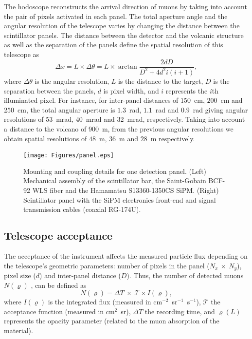 \documentclass[letterpaper,11pt]{article}
\begin{document}
The hodoscope reconstructs the arrival direction of muons by taking into account the pair of pixels activated in each panel. The total aperture angle and the angular resolution of the telescope varies by changing the distance between the scintillator panels. The distance between the detector and the volcanic structure as well as the separation of the panels define the spatial resolution of this telescope as
\begin{equation}
\Delta x=L\times\Delta\theta=L\times \arctan{\frac{2dD}{D^2+4d^2i(i+1)}},
\end{equation}
where $\Delta\theta$ is the angular resolution, $L$ is the distance to the target, $D$ is the separation between the panels, $d$ is pixel width, and $i$ represents the $i$th illuminated pixel. For instance, for inter-panel distances of $150$~cm, $200$~cm and $250$~cm, the total angular aperture is $1.3$~rad, $1.1$~rad and $0.9$~rad giving angular resolutions of $53$~mrad, $40$~mrad and $32$~mrad, respectively. Taking into account a distance to the volcano of $900$~m, from the previous angular resolutions we obtain spatial resolutions of $48$~m, $36$~m and $28$~m respectively.
\begin{figure}[htb]
\centering
\texttt{[image: Figures/panel.eps]}
\caption{Mounting and coupling details for one detection panel. (Left) Mechanical assembly of the scintillator bar, the Saint-Gobain BCF-92 WLS fiber and the Hamamatsu S13360-1350CS SiPM. (Right) Scintillator panel with the SiPM electronics front-end and signal transmission cables (coaxial RG-174U).}
\label{fig:frame}
\end{figure}

\subsection{Telescope acceptance}
The acceptance of the instrument affects the measured particle flux depending on the telescope's geometric parameters: number of pixels in the panel ($N_x~\times~N_y$), pixel size ($d$) and inter-panel distance ($D$). Thus, the number of detected muons $N(\varrho)$ \cite{LesparreEtal2010}, can be defined as
\begin{equation}
N(\varrho)=\Delta T~\times~\mathcal{T}\times I(\varrho), \label{Nmuons}
\end{equation}
where $I(\varrho)$ is the integrated flux (measured in cm$^{-2}$~sr$^{-1}$~s$^{-1}$), $\mathcal{T}$ the acceptance function (measured in cm$^{2}$~sr), $\Delta T$ the recording time, and $\varrho(L)$ represents the opacity parameter (related to the muon absorption of the material).
\end{document}
